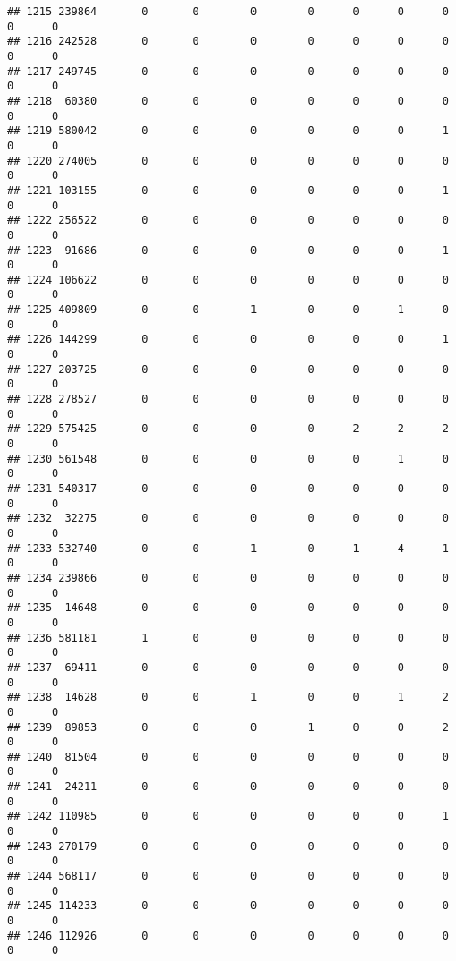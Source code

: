 \documentclass[
]{article}
\begin{document}
\begin{verbatim}
## 1215 239864       0       0        0        0      0      0      0     0      0
## 1216 242528       0       0        0        0      0      0      0     0      0
## 1217 249745       0       0        0        0      0      0      0     0      0
## 1218  60380       0       0        0        0      0      0      0     0      0
## 1219 580042       0       0        0        0      0      0      1     0      0
## 1220 274005       0       0        0        0      0      0      0     0      0
## 1221 103155       0       0        0        0      0      0      1     0      0
## 1222 256522       0       0        0        0      0      0      0     0      0
## 1223  91686       0       0        0        0      0      0      1     0      0
## 1224 106622       0       0        0        0      0      0      0     0      0
## 1225 409809       0       0        1        0      0      1      0     0      0
## 1226 144299       0       0        0        0      0      0      1     0      0
## 1227 203725       0       0        0        0      0      0      0     0      0
## 1228 278527       0       0        0        0      0      0      0     0      0
## 1229 575425       0       0        0        0      2      2      2     0      0
## 1230 561548       0       0        0        0      0      1      0     0      0
## 1231 540317       0       0        0        0      0      0      0     0      0
## 1232  32275       0       0        0        0      0      0      0     0      0
## 1233 532740       0       0        1        0      1      4      1     0      0
## 1234 239866       0       0        0        0      0      0      0     0      0
## 1235  14648       0       0        0        0      0      0      0     0      0
## 1236 581181       1       0        0        0      0      0      0     0      0
## 1237  69411       0       0        0        0      0      0      0     0      0
## 1238  14628       0       0        1        0      0      1      2     0      0
## 1239  89853       0       0        0        1      0      0      2     0      0
## 1240  81504       0       0        0        0      0      0      0     0      0
## 1241  24211       0       0        0        0      0      0      0     0      0
## 1242 110985       0       0        0        0      0      0      1     0      0
## 1243 270179       0       0        0        0      0      0      0     0      0
## 1244 568117       0       0        0        0      0      0      0     0      0
## 1245 114233       0       0        0        0      0      0      0     0      0
## 1246 112926       0       0        0        0      0      0      0     0      0

\end{verbatim}
\end{document}
